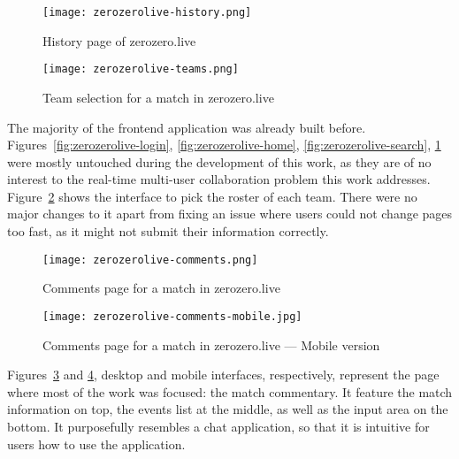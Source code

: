 \begin{figure}[h]
    \begin{center}
        \leavevmode
        \texttt{[image: zerozerolive-history.png]}
        \caption{History page of zerozero.live}
        \label{fig:zerozerolive-history}
    \end{center}
\end{figure}

\begin{figure}[h]
    \begin{center}
        \leavevmode
        \texttt{[image: zerozerolive-teams.png]}
        \caption{Team selection for a match in zerozero.live}
        \label{fig:zerozerolive-teams}
    \end{center}
\end{figure}

The majority of the frontend application was already built before. Figures~\ref{fig:zerozerolive-login}, \ref{fig:zerozerolive-home}, \ref{fig:zerozerolive-search}, \ref{fig:zerozerolive-history} were mostly untouched during the development of this work, as they are of no interest to the real-time multi-user collaboration problem this work addresses. Figure~\ref{fig:zerozerolive-teams} shows the interface to pick the roster of each team. There were no major changes to it apart from fixing an issue where users could not change pages too fast, as it might not submit their information correctly.

\begin{figure}[h]
    \begin{center}
        \leavevmode
        \texttt{[image: zerozerolive-comments.png]}
        \caption{Comments page for a match in zerozero.live}
        \label{fig:zerozerolive-comments}
    \end{center}
\end{figure}

\begin{figure}[h]
    \begin{center}
        \leavevmode
        \texttt{[image: zerozerolive-comments-mobile.jpg]}
        \caption{Comments page for a match in zerozero.live --- Mobile version}
        \label{fig:zerozerolive-comments-mobile}
    \end{center}
\end{figure}

Figures~\ref{fig:zerozerolive-comments} and \ref{fig:zerozerolive-comments-mobile}, desktop and mobile interfaces, respectively, represent the page where most of the work was focused: the match commentary. It feature the match information on top, the events list at the middle, as well as the input area on the bottom. It purposefully resembles a chat application, so that it is intuitive for users how to use the application.

